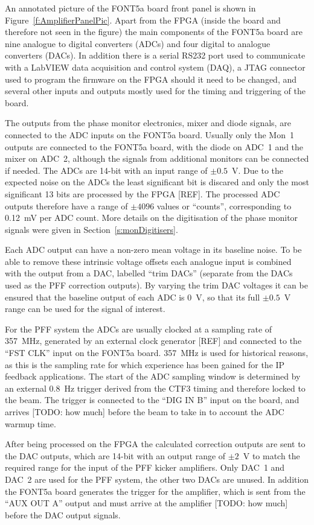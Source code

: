 An annotated picture of the FONT5a board front panel is shown in Figure~\ref{f:AmplifierPanelPic}. Apart from the FPGA (inside the board and therefore not seen in the figure) the main components of the FONT5a board are nine analogue to digital converters (ADCs) and four digital to analogue converters (DACs). In addition there is a serial RS232 port used to communicate with a LabVIEW data acquisition and control system (DAQ), a JTAG connector used to program the firmware on the FPGA should it need to be changed, and several other inputs and outputs mostly used for the timing and triggering of the board.

The outputs from the phase monitor electronics, mixer and diode signals, are connected to the ADC inputs on the FONT5a board. Usually only the Mon~1 outputs are connected to the FONT5a board, with the diode on ADC~1 and the mixer on ADC~2, although the signals from additional monitors can be connected if needed. The ADCs are 14-bit with an input range of \(\pm0.5\)~V. Due to the expected noise on the ADCs the least significant bit is discared and only the most significant 13 bits are processed by the FPGA [REF]. The processed ADC outputs therefore have a range of \(\pm4096\) values or ``counts'', corresponding to 0.12~mV per ADC count. More details on the digitisation of the phase monitor signals were given in Section~\ref{s:monDigitisers}. 

Each ADC output can have a non-zero mean voltage in its baseline noise. To be able to remove these intrinsic voltage offsets each analogue input is combined with the output from a DAC, labelled ``trim DACs'' (separate from the DACs used as the PFF correction outputs). By varying the trim DAC voltages it can be ensured that the baseline output of each ADC is 0~V, so that its full \(\pm0.5\)~V range can be used for the signal of interest.

For the PFF system the ADCs are usually clocked at a sampling rate of 357~MHz, generated by an external clock generator [REF] and connected to the ``FST CLK'' input on the FONT5a board. 357~MHz is used for historical reasons, as this is the sampling rate for which experience has been gained for the IP feedback applications. The start of the ADC sampling window is determined by an external 0.8~Hz trigger derived from the CTF3 timing and therefore locked to the beam. The trigger is connected to the ``DIG IN B'' input on the board, and arrives [TODO: how much] before the beam to take in to account the ADC warmup time.

After being processed on the FPGA the calculated correction outputs are sent to the DAC outputs, which are 14-bit with an output range of \(\pm2\)~V to match the required range for the input of the PFF kicker amplifiers. Only DAC~1 and DAC~2 are used for the PFF system, the other two DACs are unused. In addition the FONT5a board generates the trigger for the amplifier, which is sent from the ``AUX OUT A'' output and must arrive at the amplifier [TODO: how much] before the DAC output signals.

